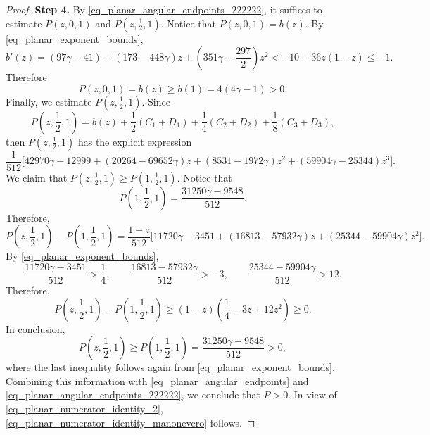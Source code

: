 \documentclass[11pt]{amsart}
\renewcommand{\leq}{\leqslant}
\renewcommand{\geq}{\geqslant}
\renewcommand{\ge}{>}
\theoremstyle{definition}
\theoremstyle{remark}
\numberwithin{equation}{section}
\begin{document}
\begin{proof}
\smallskip
\noindent \textbf{Step 4.}
By \eqref{eq_planar_angular_endpoints_222222}, it suffices to estimate $P(z,0,1)$ and $P\left(z,\frac{1}{2},1\right)$.
Notice that $P(z,0,1)=b(z)$.
By \eqref{eq_planar_exponent_bounds},
\begin{equation*}
b'(z)=(97\gamma-41)+(173-448\gamma)z
  +\left(351\gamma-\frac{297}{2}\right)z^2<-10+36z(1-z)\leq-1.
\end{equation*}
Therefore
\[
P(z,0,1)=b(z)\geq b(1)=4(4\gamma-1)>0.
\]
Finally, we estimate $P\left(z,\frac{1}{2},1\right)$. Since
\[
P\left(z,\frac12,1\right)
=b(z)+\frac12(C_1+D_1)
+\frac14(C_2+D_2)+\frac18(C_3+D_3),
\]
then $P\left(z,\frac{1}{2},1\right)$ has the explicit expression
\[
\frac1{512}\big[
42970\gamma-12999
 +(20264-69652\gamma)z+(8531-1972\gamma)z^2
 +(59904\gamma-25344)z^3
\big].
\]
We claim that 
\(P\left(z,\frac{1}{2},1\right)\geq P\left(1,\frac12,1\right)\).
Notice that 
\[
P\left(1,\frac12,1\right)
=\frac{31250\gamma-9548}{512}.
\]
Therefore,
\[
P\left(z,\frac12,1\right)-P\left(1,\frac12,1\right)
=\frac{1-z}{512}\big[
11720\gamma-3451
+(16813-57932\gamma)z
+(25344-59904\gamma)z^2
\big].
\]
By \eqref{eq_planar_exponent_bounds},
\[
\frac{11720\gamma-3451}{512}>\frac14,
\qquad
\frac{16813-57932\gamma}{512}>-3,
\qquad
\frac{25344-59904\gamma}{512}>12.
\]
Therefore,
\[
P\left(z,\frac12,1\right)-P\left(1,\frac12,1\right)
\geq(1-z)\left(\frac14-3z+12z^2\right)
\geq0.
\]
In conclusion,
\[
P\left(z,\frac12,1\right)
\geq P\left(1,\frac12,1\right)
=\frac{31250\gamma-9548}{512}
>0,
\]
where the last inequality follows again from
\eqref{eq_planar_exponent_bounds}. Combining this information with \eqref{eq_planar_angular_endpoints} and \eqref{eq_planar_angular_endpoints_222222}, we conclude that $P\ge 0$. In view of \eqref{eq_planar_numerator_identity_2}, \eqref{eq_planar_numerator_identity_manonevero} follows.


\end{proof}
\end{document}

